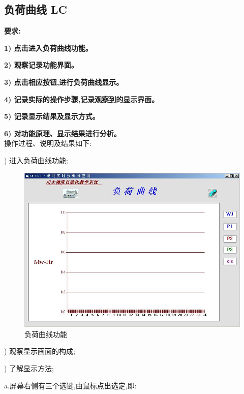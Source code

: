 \documentclass[a4paper]{ctexrep}
\begin{document}
                \newpage

                \subsection{负荷曲线 LC}
                    \textbf{要求:}

                    \quad \textbf{1) 点击进入负荷曲线功能。}

                    \quad \textbf{2) 观察记录功能界面。}

                    \quad \textbf{3) 点击相应按钮,进行负荷曲线显示。}

                    \quad \textbf{4) 记录实际的操作步骤,记录观察到的显示界面。}

                    \quad \textbf{5) 记录显示结果及显示方式。}

                    \quad \textbf{6) 对功能原理、显示结果进行分析。} \\

                    操作过程、说明及结果如下:

                    ) 进入负荷曲线功能;

                    \begin{figure}[htbp]
                        \centering
                        \includegraphics[width=12cm]{26.png} 
                        \caption{负荷曲线功能}
                    \end{figure}

                    ) 观察显示画面的构成;

                    ) 了解显示方法;

                    \qquad a.屏幕右侧有三个选键,由鼠标点出选定,即:
\end{document}
